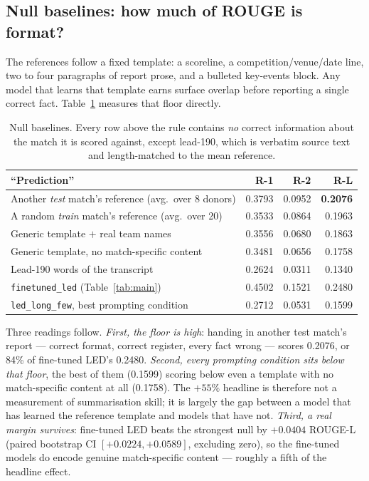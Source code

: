 \documentclass[10pt,a4paper]{article}
\begin{document}
\subsection{Null baselines: how much of ROUGE is format?}
\label{sec:null}

The references follow a fixed template: a scoreline, a competition/venue/date line, two to four paragraphs of report prose, and a bulleted key-events block. Any model that learns that template earns surface overlap before reporting a single correct fact. Table~\ref{tab:null} measures that floor directly.

\begin{table}[h]
\centering\small
\begin{tabular}{lrrr}
\toprule
\textbf{``Prediction''} & \textbf{R-1} & \textbf{R-2} & \textbf{R-L} \\
\midrule
Another \emph{test} match's reference (avg.\ over 8 donors)   & 0.3793 & 0.0952 & \textbf{0.2076} \\
A random \emph{train} match's reference (avg.\ over 20)       & 0.3533 & 0.0864 & 0.1963 \\
Generic template $+$ real team names                          & 0.3556 & 0.0680 & 0.1863 \\
Generic template, no match-specific content                   & 0.3481 & 0.0656 & 0.1758 \\
Lead-190 words of the transcript                              & 0.2624 & 0.0311 & 0.1340 \\
\midrule
\rowcolor{gray!12} \texttt{finetuned\_led} (Table~\ref{tab:main})        & 0.4502 & 0.1521 & 0.2480 \\
\texttt{led\_long\_few}, best prompting condition             & 0.2712 & 0.0531 & 0.1599 \\
\bottomrule
\end{tabular}
\caption{Null baselines. Every row above the rule contains \emph{no} correct information about the match it is scored against, except lead-190, which is verbatim source text and length-matched to the mean reference.}
\label{tab:null}
\end{table}

Three readings follow. \emph{First, the floor is high}: handing in another test match's report --- correct format, correct register, every fact wrong --- scores 0.2076, or 84\% of fine-tuned LED's 0.2480. \emph{Second, every prompting condition sits below that floor}, the best of them (0.1599) scoring below even a template with no match-specific content at all (0.1758). The $+55\%$ headline is therefore not a measurement of summarisation skill; it is largely the gap between a model that has learned the reference template and models that have not. \emph{Third, a real margin survives}: fine-tuned LED beats the strongest null by $+0.0404$ ROUGE-L (paired bootstrap CI $[+0.0224, +0.0589]$, excluding zero), so the fine-tuned models do encode genuine match-specific content --- roughly a fifth of the headline effect.
\end{document}
